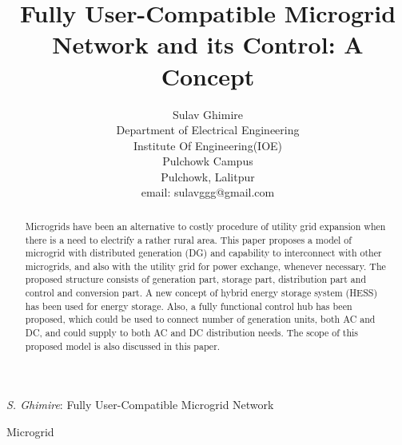 \documentclass[journal,twoside]{IEEEtran}
\begin{document}
    \setcounter{page}{46}

\title{Fully User-Compatible Microgrid Network and its Control: A Concept}

\author{
    Sulav Ghimire\\
    Department of Electrical Engineering\\
    Institute Of Engineering(IOE)\\
    Pulchowk Campus\\
    Pulchowk, Lalitpur\\
email: sulavggg@gmail.com\\
}

%
{\textit{S. Ghimire}: Fully User-Compatible Microgrid Network}

\maketitle
\begin{abstract}
Microgrids have been an alternative to costly procedure of utility grid  expansion when there is a need to electrify a rather rural area. This paper proposes a model of microgrid with distributed generation (DG) and capability to interconnect with other microgrids, and also with the utility grid for power exchange, whenever necessary. The proposed structure consists of generation part, storage part, distribution part and control and conversion part. A new concept of hybrid energy storage system (HESS) has been used for energy storage. Also, a fully functional control hub has been proposed, which could be used to connect number of generation units, both AC and DC, and could supply to both AC and DC distribution needs. The scope of this proposed model is also discussed in this paper.
\end{abstract}
\begin{IEEEkeywords}
Microgrid
\end{IEEEkeywords}
\end{document}
